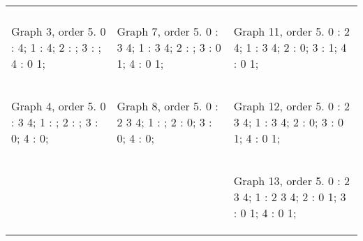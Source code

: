 \begin{tabular}{|p{1.5in} | p{1.5in} | p{1.5in} |}
\begin{minipage}{1.5in}
\begin{output}
\end{output}
\end{minipage}
\\
\begin{minipage}{1.5in}
\begin{output}
Graph 3, order 5.
0 : 4;
1 : 4;
2 : ;
3 : ;
4 : 0 1;

\end{output}
\end{minipage}
&
\begin{minipage}{1.5in}
\begin{output}
Graph 7, order 5.
0 : 3 4;
1 : 3 4;
2 : ;
3 : 0 1;
4 : 0 1;

\end{output}
\end{minipage}
&
\begin{minipage}{1.5in}
\begin{output}
Graph 11, order 5.
0 : 2 4;
1 : 3 4;
2 : 0;
3 : 1;
4 : 0 1;

\end{output}
\end{minipage}
\\
\begin{minipage}{1.5in}
\begin{output}
Graph 4, order 5.
0 : 3 4;
1 : ;
2 : ;
3 : 0;
4 : 0;

\end{output}
\end{minipage}
&
\begin{minipage}{1.5in}
\begin{output}
Graph 8, order 5.
0 : 2 3 4;
1 : ;
2 : 0;
3 : 0;
4 : 0;

\end{output}
\end{minipage}
&
\begin{minipage}{1.5in}
\begin{output}
Graph 12, order 5.
0 : 2 3 4;
1 : 3 4;
2 : 0;
3 : 0 1;
4 : 0 1;

\end{output}
\end{minipage}
\\
&
&
\begin{minipage}{1.5in}
\begin{output}
Graph 13, order 5.
0 : 2 3 4;
1 : 2 3 4;
2 : 0 1;
3 : 0 1;
4 : 0 1;

\end{output}
\end{minipage}
\\
\end{tabular}


